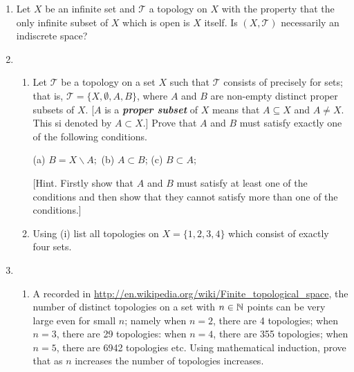 \documentclass[10pt,a4paper]{report}
\newcommand{\TT}{\mathcal{T}}
\begin{document}
\begin{enumerate}
\begin{align*}
	S \subseteq X \text{ and } |S| = \infty\\
	| X\backslash S | < \infty \implies X\backslash S \text{ is open}
\end{align*}there are an infinite number of finite subsets whose compliment is infinite and closed.  These are precisely what make up a discrete topology.

\item Let $X$ be an infinite set and $\TT$ a topology on $X$ with the property that the only infinite subset of $X$ which is open is $X$ itself.  Is $(X,\TT)$ necessarily an indiscrete space?

\item \begin{enumerate}[label=(\roman*)]
	\item Let $\TT$ be a topology on a set $X$ such that $\TT$ consists of precisely for sets; that is, $\TT = \{X,\emptyset, A,B\}$, where $A$ and $B$ are non-empty distinct proper subsets of $X$.  [$A$ is a \textbf{\textit{proper subset}} of $X$ means that $A \subseteq X$ and $A \ne X$.  This si denoted by $A\subset X$.]  Prove that $A$ and $B$ must satisfy exactly one of the following conditions.
	\begin{center}
	(a) $B=X\backslash A;$    (b) $A \subset B$;    (c) $B\subset A$;	
	\end{center}
[Hint. Firstly show that $A$ and $B$ must satisfy at least one of the conditions and then show that they cannot satisfy more than one of the conditions.]

\item Using (i) list all topologies on $X =\{1,2,3,4\}$ which consist of exactly four sets.
	
\end{enumerate}

\item \begin{enumerate}[label=(\roman*)]
	\item A recorded in \url{http://en.wikipedia.org/wiki/Finite_topological_space}, the number of distinct topologies on a set with $n \in \mathbb{N}$ points can be very large even for small $n$; namely when $n =2$, there are 4 topologies;  when $n=3$, there are 29 topologies:  when $n=4$, there are 355 topologies;  when $n=5$, there are 6942 topologies etc.  Using mathematical induction, prove that as $n$ increases the number of topologies increases.
	

\end{enumerate}
\end{enumerate}
\end{document}

